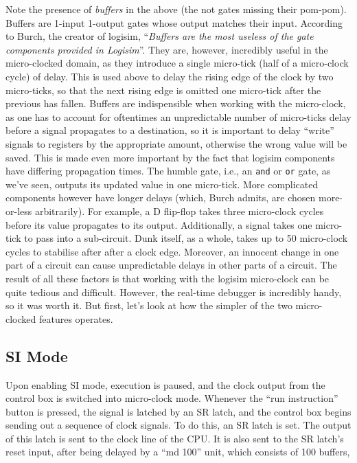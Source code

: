 \documentclass{article}
\def\gate#1{\uppercase{\Verb|#1|}}
\begin{document}
Note the presence of \textit{buffers} in the above (the not gates missing their pom-pom). Buffers are 1-input 1-output gates whose output matches their input. According to Burch, the creator of logisim, ``\textit{Buffers are the most useless of the gate components provided in Logisim}''. They are, however, incredibly useful in the micro-clocked domain, as they introduce a single micro-tick (half of a micro-clock cycle) of delay. This is used above to delay the rising edge of the clock by two micro-ticks, so that the next rising edge is omitted one micro-tick after the previous has fallen. Buffers are indispensible when working with the micro-clock, as one has to account for oftentimes an unpredictable number of micro-ticks delay before a signal propagates to a destination, so it is important to delay ``write'' signals to registers by the appropriate amount, otherwise the wrong value will be saved. This is made even more important by the fact that logisim components have differing propagation times. The humble gate, i.e., an \gate{and} or \gate{or} gate, as we've seen, outputs its updated value in one micro-tick. More complicated components however have longer delays (which, Burch admits, are chosen more-or-less arbitrarily). For example, a D flip-flop takes three micro-clock cycles before its value propagates to its output. Additionally, a signal takes one micro-tick to pass into a sub-circuit. Dunk itself, as a whole, takes up to 50 micro-clock cycles to stabilise after after a clock edge. Moreover, an innocent change in one part of a circuit can cause unpredictable delays in other parts of a circuit. The result of all these factors is that working with the logisim micro-clock can be quite tedious and difficult. However, the real-time debugger is incredibly handy, so it was worth it. But first, let's look at how the simpler of the two micro-clocked features operates.

\subsection{SI Mode}
Upon enabling SI mode, execution is paused, and the clock output from the control box is switched into micro-clock mode. Whenever the ``run instruction'' button is pressed, the signal is latched by an SR latch, and the control box begins sending out a sequence of clock signals. To do this, an SR latch is set. The output of this latch is sent to the clock line of the CPU. It is also sent to the SR latch's reset input, after being delayed by a ``md 100'' unit, which consists of 100 buffers,
\end{document}
